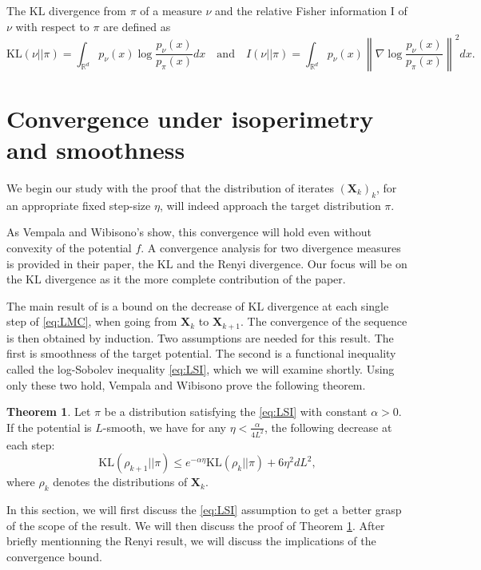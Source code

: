 \documentclass[10pt,journal,a4paper]{IEEEtran}
\theoremstyle{definition}
\newtheorem{theorem}{Theorem}[section]
\newcommand{\R}{\mathbb{R}}
\newcommand{\bX}{\mathbf{X}}
\newcommand{\KL}{\text{KL}}
\begin{document}
The $\KL$ divergence from $\pi$ of a measure $\nu$ and the relative Fisher information I of $\nu$ with respect to $\pi$ are defined as
\[
\KL(\nu || \pi) = \int_{\R^d} p_\nu(x)\log\frac{p_\nu(x)}{p_\pi(x)}dx \quad \text{and} \quad I(\nu || \pi) = \int_{\R^d} p_\nu(x)\left\|\nabla \log\frac{p_\nu(x)}{p_\pi(x)}\right\|^2dx.
\]

\section{Convergence under isoperimetry and smoothness}

We begin our study with the proof that the distribution of iterates $(\bX_k)_k$, for an appropriate fixed step-size $\eta$, will indeed approach the target distribution $\pi$. 

As Vempala and Wibisono's show, this convergence will hold even without convexity of the potential $f$. A convergence analysis for two divergence measures is provided in their paper\cite{vempala_rapid_2019}, the $\KL$ and the Renyi divergence. Our focus will be on the $\KL$ divergence as it the more complete contribution of the paper.

The main result of \cite{vempala_rapid_2019} is a bound on the decrease of $\KL$ divergence at each single step of \eqref{eq:LMC}, when going from $\bX_k$ to $\bX_{k+1}$. The convergence of the sequence is then obtained by induction. Two assumptions are needed for this result. The first is smoothness of the target potential. The second is a functional inequality called the log-Sobolev inequality \eqref{eq:LSI}, which we will examine shortly. Using only these two hold, Vempala and Wibisono prove the following theorem. 

\begin{boxF}
\begin{theorem}
Let $\pi$ be a distribution satisfying the \eqref{eq:LSI} with constant $\alpha > 0$. If the potential is $L$-smooth, we have for any $\eta < \frac{\alpha}{4L^2}$, the following decrease at each step:
\[
\KL(\rho_{k+1} || \pi) \leq e^{-\alpha \eta}\KL(\rho_{k} || \pi) + 6\eta^2 d L^2,
\]
where $\rho_k$ denotes the distributions of $\bX_k$.
\label{thm:step}
\end{theorem}
\end{boxF}
In this section, we will first discuss the \eqref{eq:LSI} assumption to get a better grasp of the scope of the result. We will then discuss the proof of Theorem \ref{thm:step}. After briefly mentionning the Renyi result, we will discuss the implications of the convergence bound.
\end{document}
